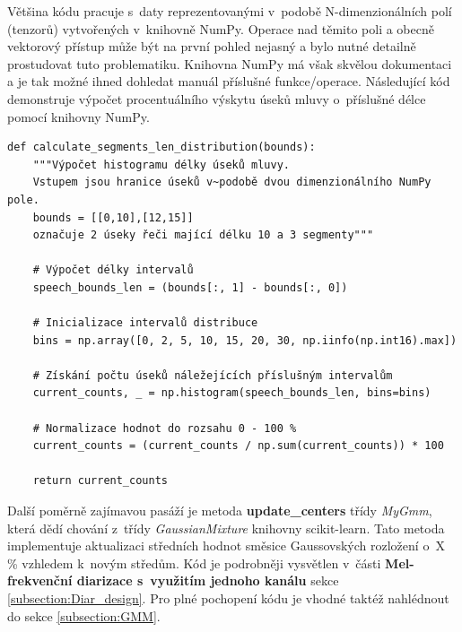 Většina kódu pracuje s~daty reprezentovanými v~podobě N-dimenzionálních polí (tenzorů) vytvořených v~knihovně NumPy. Operace nad těmito poli a obecně vektorový přístup může být na první pohled nejasný a bylo nutné detailně prostudovat tuto problematiku. Knihovna NumPy má však skvělou dokumentaci a je tak možné ihned dohledat manuál příslušné funkce/operace. Následující kód demonstruje výpočet procentuálního výskytu úseků mluvy o~příslušné délce pomocí knihovny NumPy.

\begin{verbatim}
def calculate_segments_len_distribution(bounds):
    """Výpočet histogramu délky úseků mluvy. 
    Vstupem jsou hranice úseků v~podobě dvou dimenzionálního NumPy pole.
    bounds = [[0,10],[12,15]] 
    označuje 2 úseky řeči mající délku 10 a 3 segmenty"""
    
    # Výpočet délky intervalů
    speech_bounds_len = (bounds[:, 1] - bounds[:, 0])

    # Inicializace intervalů distribuce
    bins = np.array([0, 2, 5, 10, 15, 20, 30, np.iinfo(np.int16).max])

    # Získání počtu úseků náležejících příslušným intervalům
    current_counts, _ = np.histogram(speech_bounds_len, bins=bins)
    
    # Normalizace hodnot do rozsahu 0 - 100 % 
    current_counts = (current_counts / np.sum(current_counts)) * 100
    
    return current_counts
\end{verbatim}

Další poměrně zajímavou pasáží je metoda \textbf{update\_centers} třídy \textit{MyGmm}, která dědí chování z~třídy \textit{GaussianMixture} knihovny scikit-learn. Tato metoda implementuje aktualizaci středních hodnot směsice Gaussovských rozložení o~X \% vzhledem k~novým středům. Kód je podrobněji vysvětlen v~části \textbf{Mel-frekvenční diarizace s~využitím jednoho kanálu} sekce \ref{subsection:Diar_design}. Pro plné pochopení kódu je vhodné taktéž nahlédnout do sekce \ref{subsection:GMM}.

